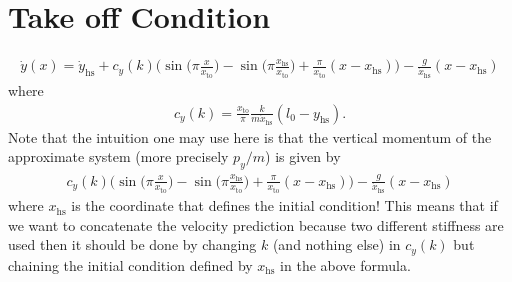 \documentclass[journal,12pt,onecolumn]{IEEEtran}
\begin{document}
\section{Take off Condition}
\begin{align}
	\dot{y}(x) =\dot{y}_{\text{hs}} + c_{y}(k) \Big(\sin \Big(\pi\frac{x}{x_\text{to}}\Big) - \sin \Big(\pi\frac{x_\text{hs}}{x_\text{to}} \Big) + \frac{\pi}{x_{\text{to}}}(x-x_{\text{hs}}) \Big) - \frac{g}{\dot{x}_{\text{hs}}}(x-x_{\text{hs}})
\end{align}
where 
\begin{align}
	c_{y}(k) = \frac{x_{\text{to}}}{\pi} \frac{k}{m \dot{x}_{\text{hs}}} (l_0-y_\text{hs}).
\end{align}
Note that the intuition one may use here is that the vertical momentum of the approximate system (more precisely $p_y/m$) is given by
\begin{align}
c_{y}(k) \Big(\sin \Big(\pi\frac{x}{x_\text{to}}\Big) - \sin \Big(\pi\frac{x_\text{hs}}{x_\text{to}} \Big) + \frac{\pi}{x_{\text{to}}}(x-x_{\text{hs}}) \Big) - \frac{g}{\dot{x}_{\text{hs}}}(x-x_{\text{hs}})
\end{align}
where $x_{\text{hs}}$ is the coordinate that defines the initial condition! This means that if we want to concatenate the velocity prediction because two different stiffness are used then it should be done by changing $k$ (and nothing else) in $c_y(k)$ but chaining the initial condition defined by $x_{\text{hs}}$ in the above formula.
\end{document}
